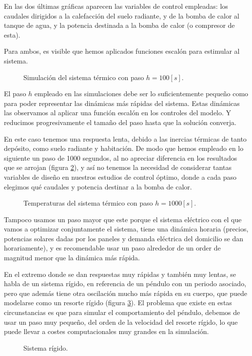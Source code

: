 En las dos últimas gráficas aparecen las variables de control empleadas: los
caudales dirigidos a la calefacción del suelo radiante, y de la bomba de calor
al tanque de agua, y la potencia destinada a la bomba de calor (o compresor de
esta).

Para ambos, es visible que hemos aplicados funciones escalón para estimular al
sistema.

\begin{figure}[h] \centering
	\centering
	
	\caption{Simulación del sistema térmico con paso $h=100[s]$.}
	\label{fig:simulacion_1}
\end{figure}


El paso $h$ empleado en las simulaciones debe ser lo suficientemente pequeño
como para poder representar las dinámicas más rápidas del sistema. Estas
dinámicas las observamos al aplicar una función escalón en los controles del
modelo. Y reducimos progresivamente el tamaño del paso hasta que la solución
converja.

En este caso tenemos una respuesta lenta, debido a las inercias térmicas de
tanto depósito, como suelo radiante y habitación. De modo que hemos empleado en
lo siguiente un paso de 1000 segundos, al no apreciar diferencia en los
resultados que se arrojan (figura \ref{fig:simulacion_2_h:1000}), y así no tenemos la necesidad de considerar tantas
variables de diseño en nuestros estudios de control óptimo, donde a cada paso
elegimos qué caudales y potencia destinar a la bomba de calor.

\begin{figure}[h] \centering
	\centering
	
	\caption{Temperaturas del sistema térmico con paso $h=1000[s]$.}
	\label{fig:simulacion_2_h:1000}
\end{figure}

Tampoco usamos un paso mayor que este porque el sistema eléctrico con el que
vamos a optimizar conjuntamente el sistema, tiene una dinámica horaria
(precios, potencias solares dadas por los paneles y demanda eléctrica del
domicilio se dan horariamente), y es recomendable usar un paso alrededor de un order
de magnitud menor que la dinámica más rápida.

En el extremo donde se dan respuestas muy rápidas y también muy lentas, se
habla de un sistema rígido, en referencia de un péndulo con un periodo
asociado, pero que además tiene otra oscilación mucho más rápida en su cuerpo,
que puede modelarse como un resorte rígido (figura \ref{fig:stiff_system}). El
problema que existe en estas circunstancias es que para simular el
comportamiento del péndulo, debemos de usar un paso muy pequeño, del orden de
la velocidad del resorte rígido, lo que puede llevar a costes computacionales
muy grandes en la simulación.

\begin{figure}[h] \centering
	\centering
	
	\caption{Sistema rígido.}
	\label{fig:stiff_system}
\end{figure}
